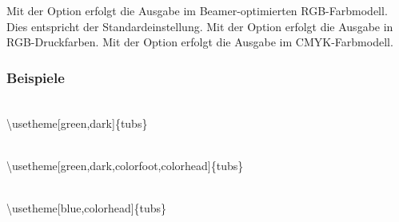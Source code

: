 Mit der Option  erfolgt die Ausgabe im Beamer-optimierten RGB-Farbmodell.
Dies entspricht der Standardeinstellung.
Mit der Option  erfolgt die Ausgabe in RGB-Druckfarben.
Mit der Option  erfolgt die Ausgabe im CMYK-Farbmodell.

\clearpage
\subsubsection{Beispiele}

\begin{center}
\begin{minipage}{0.49\textwidth}
\end{minipage}\hfill
\begin{minipage}{0.49\textwidth}
\end{minipage}\medskip\\
{\ttfamily \textbackslash usetheme[green,dark]\{tubs\}}
\end{center}

\begin{center}
\begin{minipage}{0.49\textwidth}
\end{minipage}
\begin{minipage}{0.49\textwidth}
\end{minipage}\medskip\\
{\ttfamily \textbackslash usetheme[green,dark,colorfoot,colorhead]\{tubs\}}
\end{center}

\begin{center}
\begin{minipage}{0.49\textwidth}
\end{minipage}
\begin{minipage}{0.49\textwidth}
\end{minipage}\medskip\\
{\ttfamily%
  \textbackslash usetheme[blue,colorhead]\{tubs\}}
\end{center}

